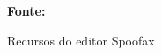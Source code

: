 \begin{figure}[h!]
\centering

\caption{\textmd{Recursos do editor Spoofax}}
\label{fig:spoofaxeditor}

\par\medskip\textbf{Fonte:} \cite{kats2010spoofax} \par\medskip
\end{figure}
